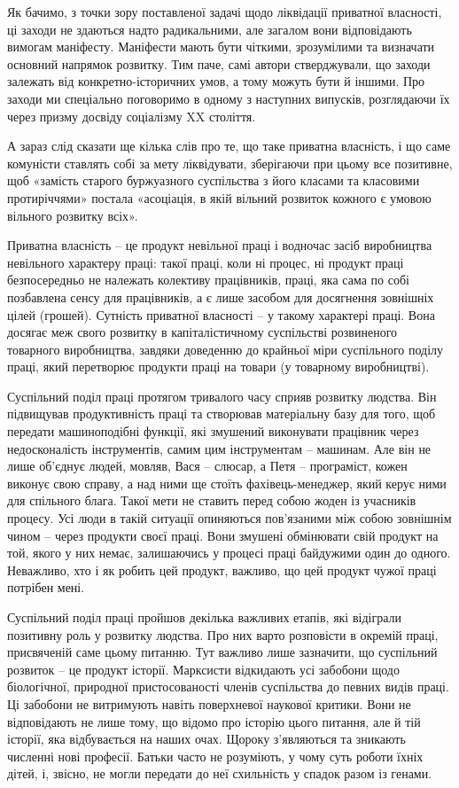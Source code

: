 \documentclass[12pt,a4paper,openany]{book}
\begin{document}
Як бачимо, з точки зору поставленої задачі щодо ліквідації приватної власності, ці заходи не здаються надто радикальними, але загалом вони відповідають вимогам маніфесту. Маніфести мають бути чіткими, зрозумілими та визначати основний напрямок розвитку. Тим паче, самі автори стверджували, що заходи залежать від конкретно-історичних умов, а тому можуть бути й іншими. Про заходи ми спеціально поговоримо в одному з наступних випусків, розглядаючи їх через призму досвіду соціалізму XX століття.

А зараз слід сказати ще кілька слів про те, що таке приватна власність, і що саме комуністи ставлять собі за мету ліквідувати, зберігаючи при цьому все позитивне, щоб «замість старого буржуазного суспільства з його класами та класовими протиріччями» постала «асоціація, в якій вільний розвиток кожного є умовою вільного розвитку всіх».

Приватна власність – це продукт невільної праці і водночас засіб виробництва невільного характеру праці: такої праці, коли ні процес, ні продукт праці безпосередньо не належать колективу працівників, праці, яка сама по собі позбавлена сенсу для працівників, а є лише засобом для досягнення зовнішніх цілей (грошей). Сутність приватної власності – у такому характері праці. Вона досягає меж свого розвитку в капіталістичному суспільстві розвиненого товарного виробництва, завдяки доведенню до крайньої міри суспільного поділу праці, який перетворює продукти праці на товари (у товарному виробництві).

Суспільний поділ праці протягом тривалого часу сприяв розвитку людства. Він підвищував продуктивність праці та створював матеріальну базу для того, щоб передати машиноподібні функції, які змушений виконувати працівник через недосконалість інструментів, самим цим інструментам – машинам. Але він не лише об’єднує людей, мовляв, Вася – слюсар, а Петя – програміст, кожен виконує свою справу, а над ними ще стоїть фахівець-менеджер, який керує ними для спільного блага. Такої мети не ставить перед собою жоден із учасників процесу. Усі люди в такій ситуації опиняються пов’язаними між собою зовнішнім чином – через продукти своєї праці. Вони змушені обмінювати свій продукт на той, якого у них немає, залишаючись у процесі праці байдужими один до одного. Неважливо, хто і як робить цей продукт, важливо, що цей продукт чужої праці потрібен мені.

Суспільний поділ праці пройшов декілька важливих етапів, які відіграли позитивну роль у розвитку людства. Про них варто розповісти в окремій праці, присвяченій саме цьому питанню. Тут важливо лише зазначити, що суспільний розвиток – це продукт історії. Марксисти відкидають усі забобони щодо біологічної, природної пристосованості членів суспільства до певних видів праці. Ці забобони не витримують навіть поверхневої наукової критики. Вони не відповідають не лише тому, що відомо про історію цього питання, але й тій історії, яка відбувається на наших очах. Щороку з’являються та зникають численні нові професії. Батьки часто не розуміють, у чому суть роботи їхніх дітей, і, звісно, не могли передати до неї схильність у спадок разом із генами.
\end{document}
